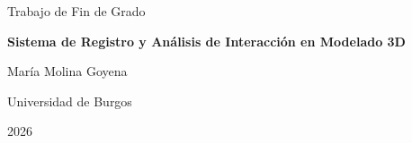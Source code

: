 \documentclass[12pt]{report}
\begin{document}
\begin{titlepage}
    \centering
    {\LARGE Trabajo de Fin de Grado \par}
    \vspace{2cm}
    {\Huge \textbf{Sistema de Registro y Análisis de Interacción en Modelado 3D}\par}
    \vspace{2cm}
    {\Large María Molina Goyena\par}
    \vfill
    {\large Universidad de Burgos\par}
    {\large 2026\par}
\end{titlepage}

\tableofcontents
\newpage












\end{document}
